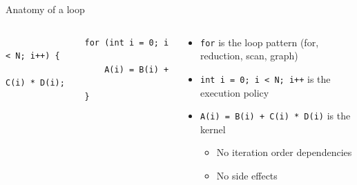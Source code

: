 \documentclass[
    aspectratio=169,
]{beamer}
\begin{document}
\begin{frame}[fragile]{Anatomy of a loop}
    \begin{columns}
        \begin{column}{0.5\linewidth}
            \begin{verbatim}
                for (int i = 0; i < N; i++) {
                    A(i) = B(i) + C(i) * D(i);
                }
            \end{verbatim}
        \end{column}
        \begin{column}{0.5\linewidth}
            \begin{itemize}
                \item \texttt{for} is the loop pattern (for, reduction, scan, graph)
                \item \texttt{int i = 0; i < N; i++} is the execution policy
                \item \texttt{A(i) = B(i) + C(i) * D(i)} is the kernel
                \begin{itemize}
                    \item No iteration order dependencies
                    \item No side effects
                \end{itemize}
            \end{itemize}
        \end{column}
    \end{columns}
\end{frame}

\end{document}
